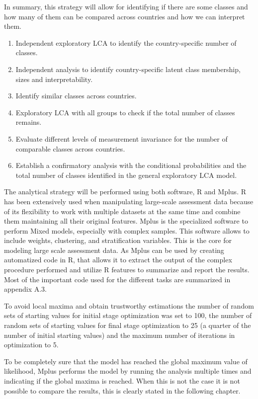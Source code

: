 \documentclass[12pt,a4paper,oneside]{reedthesis}
\providecommand{\tightlist}{%
  \setlength{\itemsep}{0pt}\setlength{\parskip}{0pt}}
\begin{document}
In summary, this strategy will allow for identifying if there are some classes and how many of them can be compared across countries and how we can interpret them.
\begin{enumerate}
\def\labelenumi{\arabic{enumi}.}
\tightlist
\item
  Independent exploratory LCA to identify the country-specific number of classes.
\item
  Independent analysis to identify country-specific latent class membership, sizes and interpretability.
\item
  Identify similar classes across countries.
\item
  Exploratory LCA with all groups to check if the total number of classes remains.
\item
  Evaluate different levels of measurement invariance for the number of comparable classes across countries.
\item
  Establish a confirmatory analysis with the conditional probabilities and the total number of classes identified in the general exploratory LCA model.
\end{enumerate}
The analytical strategy will be performed using both software, R and Mplus. R has been extensively used when manipulating large-scale assessment data because of its flexibility to work with multiple datasets at the same time and combine them maintaining all their original features. Mplus is the specialized software to perform Mixed models, especially with complex samples. This software allows to include weights, clustering, and stratification variables. This is the core for modeling large scale assessment data. As Mplus can be used by creating automatized code in R, that allows it to extract the output of the complex procedure performed and utilize R features to summarize and report the results. Most of the important code used for the different tasks are summarized in appendix A.3.

To avoid local maxima and obtain trustworthy estimations the number of random sets of starting values for initial stage optimization was set to 100, the number of random sets of starting values for final stage optimization to 25 (a quarter of the number of initial starting values) and the maximum number of iterations in optimization to 5.

To be completely sure that the model has reached the global maximum value of likelihood, Mplus performs the model by running the analysis multiple times and indicating if the global maxima is reached. When this is not the case it is not possible to compare the results, this is clearly stated in the following chapter.
\end{document}
